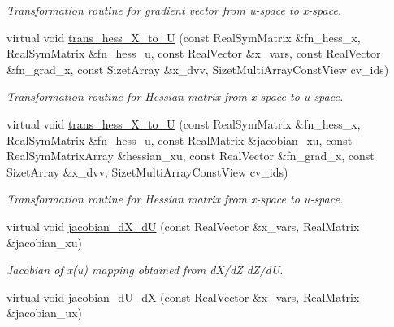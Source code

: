 \begin{DoxyCompactItemize}
\begin{DoxyCompactList}\small\item\em Transformation routine for gradient vector from u-\/space to x-\/space. \end{DoxyCompactList}\item 
virtual void \hyperlink{classPecos_1_1ProbabilityTransformation_a834e672f9ac2f1c28b8f6d2f89d7ac85}{trans\+\_\+hess\+\_\+\+X\+\_\+to\+\_\+U} (const Real\+Sym\+Matrix \&fn\+\_\+hess\+\_\+x, Real\+Sym\+Matrix \&fn\+\_\+hess\+\_\+u, const Real\+Vector \&x\+\_\+vars, const Real\+Vector \&fn\+\_\+grad\+\_\+x, const Sizet\+Array \&x\+\_\+dvv, Sizet\+Multi\+Array\+Const\+View cv\+\_\+ids)\label{classPecos_1_1ProbabilityTransformation_a834e672f9ac2f1c28b8f6d2f89d7ac85}

\begin{DoxyCompactList}\small\item\em Transformation routine for Hessian matrix from x-\/space to u-\/space. \end{DoxyCompactList}\item 
virtual void \hyperlink{classPecos_1_1ProbabilityTransformation_ad054ed1ba6cb80d20cad29f0efe7da5a}{trans\+\_\+hess\+\_\+\+X\+\_\+to\+\_\+U} (const Real\+Sym\+Matrix \&fn\+\_\+hess\+\_\+x, Real\+Sym\+Matrix \&fn\+\_\+hess\+\_\+u, const Real\+Matrix \&jacobian\+\_\+xu, const Real\+Sym\+Matrix\+Array \&hessian\+\_\+xu, const Real\+Vector \&fn\+\_\+grad\+\_\+x, const Sizet\+Array \&x\+\_\+dvv, Sizet\+Multi\+Array\+Const\+View cv\+\_\+ids)\label{classPecos_1_1ProbabilityTransformation_ad054ed1ba6cb80d20cad29f0efe7da5a}

\begin{DoxyCompactList}\small\item\em Transformation routine for Hessian matrix from x-\/space to u-\/space. \end{DoxyCompactList}\item 
virtual void \hyperlink{classPecos_1_1ProbabilityTransformation_a8e619029699319ac96359e41a74e8744}{jacobian\+\_\+d\+X\+\_\+dU} (const Real\+Vector \&x\+\_\+vars, Real\+Matrix \&jacobian\+\_\+xu)\label{classPecos_1_1ProbabilityTransformation_a8e619029699319ac96359e41a74e8744}

\begin{DoxyCompactList}\small\item\em Jacobian of x(u) mapping obtained from d\+X/dZ d\+Z/dU. \end{DoxyCompactList}\item 
virtual void \hyperlink{classPecos_1_1ProbabilityTransformation_aa180d3b929eb6f019015fbbff559c0d9}{jacobian\+\_\+d\+U\+\_\+dX} (const Real\+Vector \&x\+\_\+vars, Real\+Matrix \&jacobian\+\_\+ux)\label{classPecos_1_1ProbabilityTransformation_aa180d3b929eb6f019015fbbff559c0d9}


\end{DoxyCompactItemize}
